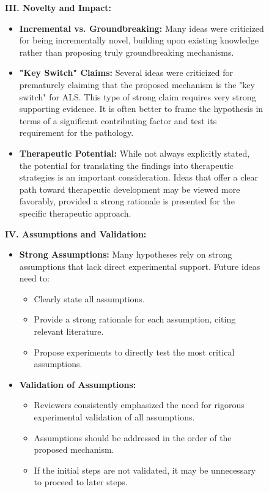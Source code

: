 \begin{figure}[htbp!]
\begin{tcolorbox}
\textbf{III. Novelty and Impact:}
\begin{itemize}
    \item \textbf{Incremental vs. Groundbreaking:} Many ideas were criticized for being incrementally novel, building upon existing knowledge rather than proposing truly groundbreaking mechanisms. 
    \item \textbf{"Key Switch" Claims:} Several ideas were criticized for prematurely claiming that the proposed mechanism is the "key switch" for ALS. This type of strong claim requires very strong supporting evidence. It is often better to frame the hypothesis in terms of a significant contributing factor and test its requirement for the pathology.
    \item \textbf{Therapeutic Potential:} While not always explicitly stated, the potential for translating the findings into therapeutic strategies is an important consideration. Ideas that offer a clear path toward therapeutic development may be viewed more favorably, provided a strong rationale is presented for the specific therapeutic approach.
\end{itemize}

\textbf{IV. Assumptions and Validation:}
\begin{itemize}
    \item \textbf{Strong Assumptions:} Many hypotheses rely on strong assumptions that lack direct experimental support. Future ideas need to:
    \begin{itemize}
        \item Clearly state all assumptions.
        \item Provide a strong rationale for each assumption, citing relevant literature.
        \item Propose experiments to directly test the most critical assumptions.
    \end{itemize}
    \item \textbf{Validation of Assumptions:}
    \begin{itemize}
        \item Reviewers consistently emphasized the need for rigorous experimental validation of all assumptions.
        \item Assumptions should be addressed in the order of the proposed mechanism.
        \item If the initial steps are not validated, it may be unnecessary to proceed to later steps.
    \end{itemize}
\end{itemize}


\end{tcolorbox}
\end{figure}
